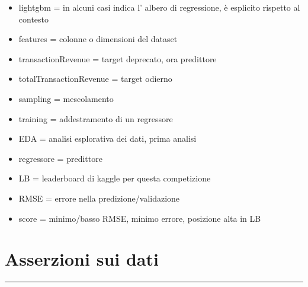 \documentclass[11pt]{article}
\providecommand{\tightlist}{%
      \setlength{\itemsep}{0pt}\setlength{\parskip}{0pt}}
\begin{document}
\begin{itemize}
\tightlist
\item
  lightgbm = in alcuni casi indica l' albero di regressione, è esplicito
  rispetto al contesto
\item
  features = colonne o dimensioni del dataset
\item
  transactionRevenue = target deprecato, ora predittore
\item
  totalTransactionRevenue = target odierno
\item
  sampling = mescolamento
\item
  training = addestramento di un regressore
\item
  EDA = analisi esplorativa dei dati, prima analisi
\item
  regressore = predittore
\item
  LB = leaderboard di kaggle per questa competizione
\item
  RMSE = errore nella predizione/validazione
\item
  score = minimo/basso RMSE, minimo errore, posizione alta in LB
\end{itemize}

    \section{Asserzioni sui dati}\label{asserzioni-sui-dati}

\begin{center}\rule{0.5\linewidth}{\linethickness}\end{center}
\end{document}
